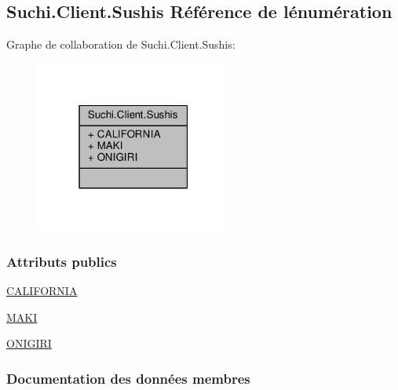 \hypertarget{enumSuchi_1_1Client_1_1Sushis}{}\subsection{Suchi.\+Client.\+Sushis Référence de l\textquotesingle{}énumération}
\label{enumSuchi_1_1Client_1_1Sushis}


Graphe de collaboration de Suchi.\+Client.\+Sushis\+:\nopagebreak
\begin{figure}[H]
\begin{center}
\leavevmode
\includegraphics[width=183pt]{enumSuchi_1_1Client_1_1Sushis__coll__graph}
\end{center}
\end{figure}
\subsubsection*{Attributs publics}
\begin{DoxyCompactItemize}
\item 
\hyperlink{enumSuchi_1_1Client_1_1Sushis_a9143ca8f57e2209fed5ef8d45b45f4ed}{C\+A\+L\+I\+F\+O\+R\+N\+I\+A}
\item 
\hyperlink{enumSuchi_1_1Client_1_1Sushis_a7f9304fc608c42b727f2da248760fbc5}{M\+A\+K\+I}
\item 
\hyperlink{enumSuchi_1_1Client_1_1Sushis_a5a4bebaf5f6bb0b133ded82613768474}{O\+N\+I\+G\+I\+R\+I}
\end{DoxyCompactItemize}


\subsubsection{Documentation des données membres}
\hypertarget{enumSuchi_1_1Client_1_1Sushis_a9143ca8f57e2209fed5ef8d45b45f4ed}{}
